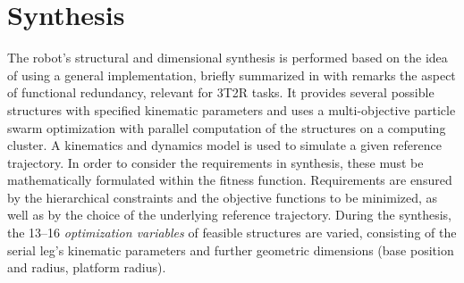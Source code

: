 \documentclass[runningheads,hidelinks]{llncs}
\begin{document}
\section{Synthesis}\label{sec:synthesis}
The robot's structural and dimensional synthesis is performed based on the idea of \cite{Krefft2006} using a general implementation, briefly summarized in \cite{Schappler2022_ARK_3T1R} with remarks the aspect of functional redundancy, relevant for 3T2R tasks.
It provides several possible structures with specified kinematic parameters
and uses a multi-objective particle swarm optimization with parallel computation of the structures on a computing cluster. %
A kinematics and dynamics model is used to simulate a given reference trajectory. 
In order to consider the requirements in synthesis, these must be mathematically formulated within the fitness function. 
Requirements are ensured by the hierarchical constraints and the objective functions to be minimized, as well as by the choice of the underlying reference trajectory. 
During the synthesis, the 13--16 \emph{optimization variables} of feasible structures are varied, consisting of the serial leg's kinematic parameters and further geometric dimensions (base position and radius, platform radius). 
\end{document}

